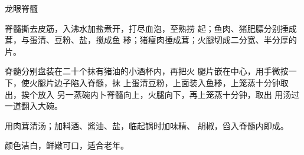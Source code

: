 \begin{recipe}{龙眼脊髓}

\ingredients


\cooking

\step 脊髓撕去皮筋，入沸水加盐煮开，打尽血泡，至熟捞 起；鱼肉、猪肥膘分别捶成茸，与蛋清、豆粉、盐，搅成鱼 糁；猪瘦肉捶成茸；火腿切成二分宽、半分厚的片。

\step 脊髓分别盘装在二十个抹有猪油的小酒杯内，再把火 腿片嵌在中心，用手微按一下，使火腿片边子陷入脊髓，抹 上蛋清豆粉，上面装入鱼糁，上笼蒸十分钟取出，挨个放入 另一蒸碗内卜脊髓向上，火腿向下，再上笼蒸十分钟，取出 用汤过一道翻入大碗。

\step 用肉茸清汤；加料酒、酱油、盐，临起锅时加味精、 胡椒，舀入脊髓内即成。

\notes

颜色洁白，鲜嫩可口，适合老年。

\end{recipe}

